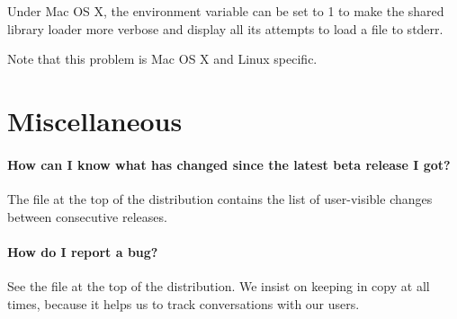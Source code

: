 Under Mac OS X, the  environment variable can
be set to 1 to make the shared library loader more verbose and display
all its attempts to load a file to stderr.

Note that this problem is Mac OS X and Linux specific.

\section{Miscellaneous}
\paragraph{How can I know what has changed since the latest beta release I got?}
The file  at the top of the distribution
contains the list of user-visible changes between consecutive
releases.

\paragraph{How do I report a bug?}
See the file  at the top of the
distribution. We insist on keeping  in
copy at all times, because it helps us to track conversations with our
users.


